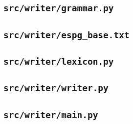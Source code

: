 \documentclass[../main.tex]{subfiles}
\begin{document}
\subsection{\texttt{src/writer/grammar.py}}


\subsection{\texttt{src/writer/espg\_base.txt}}


\subsection{\texttt{src/writer/lexicon.py}}


\subsection{\texttt{src/writer/writer.py}}


\subsection{\texttt{src/writer/main.py}}

\end{document}
